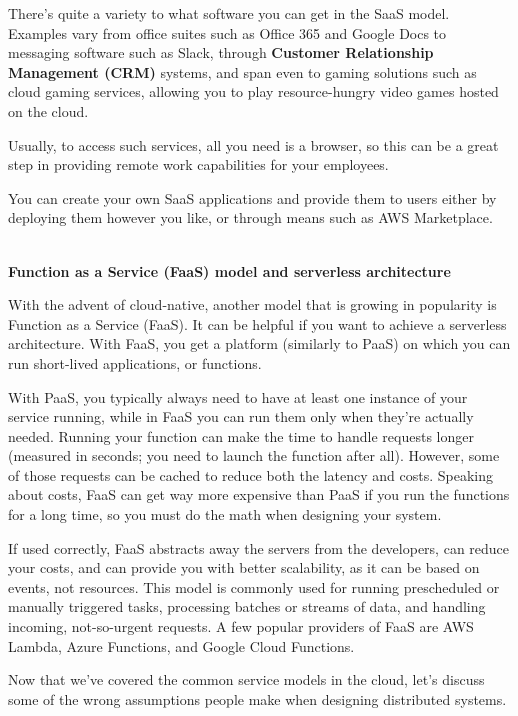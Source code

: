 There's quite a variety to what software you can get in the SaaS model. Examples vary from office suites such as Office 365 and Google Docs to messaging software such as Slack, through \textbf{Customer Relationship Management (CRM)} systems, and span even to gaming solutions such as cloud gaming services, allowing you to play resource-hungry video games hosted on the cloud.

Usually, to access such services, all you need is a browser, so this can be a great step in providing remote work capabilities for your employees.

You can create your own SaaS applications and provide them to users either by deploying them however you like, or through means such as AWS Marketplace.


\hspace*{\fill} \\ %
\noindent
\textbf{Function as a Service (FaaS) model and serverless architecture}

With the advent of cloud-native, another model that is growing in popularity is Function as a Service (FaaS). It can be helpful if you want to achieve a serverless architecture. With FaaS, you get a platform (similarly to PaaS) on which you can run short-lived applications, or functions.

With PaaS, you typically always need to have at least one instance of your service running, while in FaaS you can run them only when they're actually needed. Running your function can make the time to handle requests longer (measured in seconds; you need to launch the function after all). However, some of those requests can be cached to reduce both the latency and costs. Speaking about costs, FaaS can get way more expensive than PaaS if you run the functions for a long time, so you must do the math when designing your system.

If used correctly, FaaS abstracts away the servers from the developers, can reduce your costs, and can provide you with better scalability, as it can be based on events, not resources. This model is commonly used for running prescheduled or manually triggered tasks, processing batches or streams of data, and handling incoming, not-so-urgent requests. A few popular providers of FaaS are AWS Lambda, Azure Functions, and Google Cloud Functions.

Now that we've covered the common service models in the cloud, let's discuss some of the wrong assumptions people make when designing distributed systems.


